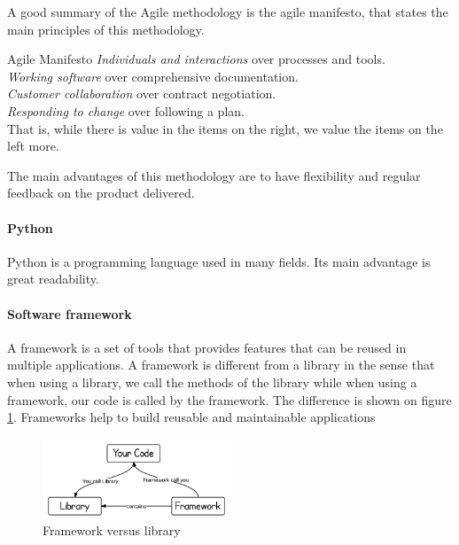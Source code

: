 A good summary of the Agile methodology is the agile manifesto\cite{agilemanifesto}, that states the main principles of this methodology.

\begin{bclogo}[logo=\bctrombone]{Agile Manifesto \cite{agilemanifesto}}
\emph{Individuals and interactions} over processes and tools.\\
\emph{Working software} over comprehensive documentation.\\
\emph{Customer collaboration} over contract negotiation.\\
\emph{Responding to change} over following a plan. \\
That is, while there is value in the items on
the right, we value the items on the left more.
\end{bclogo}

The main advantages of this methodology are to have flexibility and regular feedback on the product delivered.

\paragraph{Python}
Python is a programming language used in many fields. Its main advantage is great readability.


\paragraph{Software framework}

A framework is a set of tools that provides features that can be reused in multiple applications. A framework is different from a library in the sense that when using a library, we call the methods of the library while when using a framework, our code is called by the framework. The difference is shown on figure \ref{fig:framework-vs-library}. Frameworks help to build reusable and maintainable applications 

\begin{figure}
    \centering
    \includegraphics[width=0.5\textwidth]{images/framework-vs-library.png}
    \caption{Framework versus library}
    \label{fig:framework-vs-library}
\end{figure}

